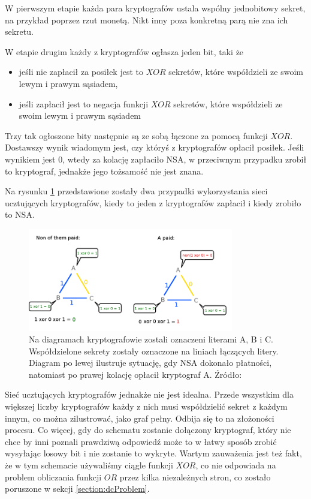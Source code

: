\documentclass[a4paper]{article}
\begin{document}
W pierwszym etapie każda para kryptografów ustala wspólny jednobitowy sekret, na przykład poprzez rzut monetą. Nikt inny poza konkretną parą nie zna ich sekretu.

W etapie drugim każdy z kryptografów ogłasza jeden bit, taki że
\begin{itemize}
    \item jeśli nie zapłacił za posiłek jest to $XOR$ sekretów, które współdzieli ze swoim lewym i prawym sąsiadem,
    \item jeśli zapłacił jest to negacja funkcji $XOR$ sekretów, które współdzieli ze swoim lewym i prawym sąsiadem
\end{itemize}
Trzy tak ogłoszone bity następnie są ze sobą łączone za pomocą funkcji $XOR$. Dostawszy wynik wiadomym jest, czy któryś z kryptografów opłacił posiłek. Jeśli wynikiem jest $0$, wtedy za kolację zapłaciło NSA, w przeciwnym przypadku zrobił to kryptograf, jednakże jego tożsamość nie jest znana.

Na rysunku \ref{img:dcNetSimulation} przedstawione zostały dwa przypadki wykorzystania sieci ucztujących kryptografów, kiedy to jeden z kryptografów zapłacił i kiedy zrobiło to NSA.

\begin{figure}[h]
\centering
\includegraphics[width=0.8\textwidth]{images/Dinning_cryptographers.png}
\caption{Na diagramach kryptografowie zostali oznaczeni literami A, B i C. Współdzielone sekrety zostały oznaczone na liniach łączących litery. Diagram po lewej ilustruje sytuację, gdy NSA dokonało płatności, natomiast po prawej kolację opłacił kryptograf A. Źródło: \cite{dcSimulation}}
\label{img:dcNetSimulation}
\end{figure}

Sieć ucztujących kryptografów jednakże nie jest idealna. Przede wszystkim dla większej liczby kryptografów każdy z nich musi współdzielić sekret z każdym innym, co można zilustrować, jako graf pełny. Odbija się to na złożoności procesu. Co więcej, gdy do schematu zostanie dołączony kryptograf, który nie chce by inni poznali prawdziwą odpowiedź może to w łatwy sposób zrobić wysyłając losowy bit i nie zostanie to wykryte. Wartym zauważenia jest też fakt, że w tym schemacie używaliśmy ciągle funkcji $XOR$, co nie odpowiada na problem obliczania funkcji $OR$ przez kilka niezależnych stron, co zostało poruszone w sekcji \ref{section:dcProblem}.
\end{document}
